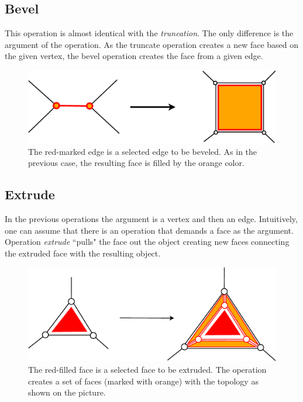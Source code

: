 \subsection{Bevel}

This operation is almost identical with the \emph{truncation}. The only difference is the argument of the
operation. As the truncate operation creates a new face based on the given vertex, the bevel operation
creates the face from a given edge.\\

\begin{figure}[ht]
\centering
\includegraphics[scale=0.2]{../img/bevel.eps}
\caption{The red-marked edge is a selected edge to be beveled. As in the previous case, the resulting
face is filled by the orange color.}
\end{figure}

\subsection{Extrude}

In the previous operations the argument is a vertex and then an edge. Intuitively, one can assume
that there is an operation that demands a face as the argument. Operation \emph{extrude} ``pulls"
the face out the object creating new faces connecting the extruded face with the resulting object.

\begin{figure}[ht]
\centering
\includegraphics[scale=0.2]{../img/extrude.eps}
\caption{The red-filled face is a selected face to be extruded. The operation creates a set of
faces (marked with orange) with the topology as shown on the picture.}
\end{figure}

